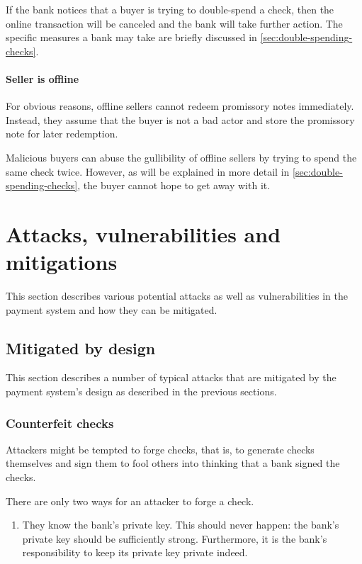 \documentclass[12pt,a4paper]{article}
\begin{document}
\begin{multicols}{2}
	If the bank notices that a buyer is trying to double-spend a check, then the online transaction will be canceled and the bank will take further action. The specific measures a bank may take are briefly discussed in \autoref{sec:double-spending-checks}.
	
	\paragraph{Seller is offline}
	
	For obvious reasons, offline sellers cannot redeem promissory notes immediately. Instead, they assume that the buyer is not a bad actor and store the promissory note for later redemption.

	Malicious buyers can abuse the gullibility of offline sellers by trying to spend the same check twice. However, as will be explained in more detail in \autoref{sec:double-spending-checks}, the buyer cannot hope to get away with it.

	\section{Attacks, vulnerabilities and mitigations}

	This section describes various potential attacks as well as vulnerabilities in the payment system and how they can be mitigated.
	
	\subsection{Mitigated by design}
	
	This section describes a number of typical attacks that are mitigated by the payment system's design as described in the previous sections.

	\subsubsection{Counterfeit checks}

	Attackers might be tempted to forge checks, that is, to generate checks themselves and sign them to fool others into thinking that a bank signed the checks.
	
	There are only two ways for an attacker to forge a check.
	
	\begin{enumerate}
		\item They know the bank's private key. This should never happen: the bank's private key should be sufficiently strong. Furthermore, it is the bank's responsibility to keep its private key private indeed.
		

\end{enumerate}
\end{multicols}
\end{document}
